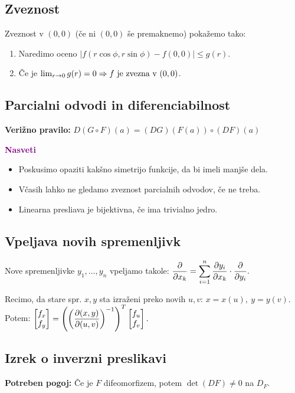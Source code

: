\subsection*{Zveznost}
Zveznost v $(0,0)$ (če ni $(0,0)$ še premaknemo) pokažemo tako:
\begin{enumerate}
    \item Naredimo oceno $|f(r \cos \phi, r \sin \phi) - f(0,0)| \leq g(r).$
    \item Če je $\lim_{r \to 0} g(r) = 0 \Rightarrow f \text{ je zvezna v } (0,0)$.
\end{enumerate}

\subsection*{Parcialni odvodi in diferenciabilnost}
\textbf{Verižno pravilo:} $D(G \circ F)(a) = (DG)(F(a)) \circ (DF)(a)$

\textbf{\textcolor{purple}{Nasveti}}
\begin{itemize}
    \item Poskusimo opaziti kakšno simetrijo funkcije, da bi imeli manjše dela.
    \item Včasih lahko ne gledamo zveznost parcialnih odvodov, če ne treba.
    \item Linearna presliava je bijektivna, če ima trivialno jedro.
\end{itemize}

\subsection*{Vpeljava novih spremenljivk}
Nove spremenljivke $y_1, \ldots, y_n$ vpeljamo takole:
$\displaystyle \frac{\partial}{\partial x_k} = \sum_{i=1}^{n} \frac{\partial y_i}{\partial x_k} \cdot \frac{\partial }{\partial y_i}.$

Recimo, da stare spr. $x, y$ sta izraženi preko novih $u, v$: $x = x(u), \ y = y(v)$. Potem:
$\displaystyle \begin{bmatrix}
    f_x \\ f_y
\end{bmatrix} = \left(\left( \frac{\partial (x,y)}{\partial (u, v)} \right)^{-1} \right)^T \begin{bmatrix}
    f_u \\ f_v
\end{bmatrix}.$

\subsection*{Izrek o inverzni preslikavi}
\textbf{Potreben pogoj:} Če je $F$ difeomorfizem, potem $\det (DF) \neq 0$ na $D_F$.

